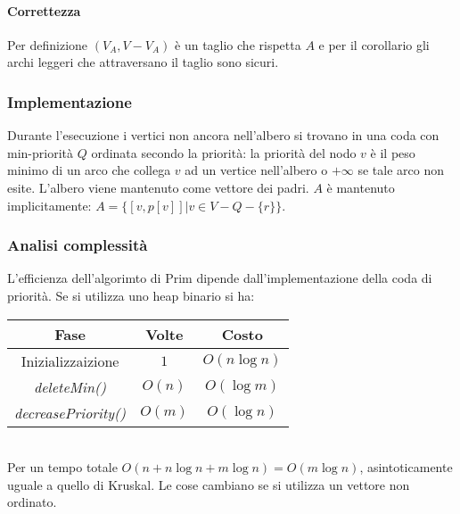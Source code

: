 \paragraph{Correttezza} Per definizione $(V_A, V - V_A)$ \`e un taglio che rispetta $A$ e per il corollario gli archi leggeri che attraversano il taglio sono sicuri. 
\subsubsection{Implementazione}
Durante l'esecuzione i vertici non ancora nell'albero si trovano in una coda con min-priorit\`a $Q$ ordinata secondo la priorit\`a: la priorit\`a del nodo $v$ \`e il peso minimo di un
arco che collega $v$ ad un vertice nell'albero o $+\infty$ se tale arco non esite. L'albero viene mantenuto come vettore dei padri. $A$ \`e mantenuto implicitamente: $A=\{[v, p[v]]|v\in
V-Q-\{r\}\}$. \\

\subsubsection{Analisi complessit\`a}
L'efficienza dell'algorimto di Prim dipende dall'implementazione della coda di priorit\`a. Se si utilizza uno heap binario si ha:\\
\begin{tabular}{|c|c|c|}
	\hline
	\textbf{Fase} & \textbf{Volte} & \textbf{Costo} \\
	\hline
	Inizializzaizione & $1$ & $O(n\log n)$ \\
	\hline
	\emph{deleteMin()} & $O(n)$ & $O(\log m)$ \\
	\hline
	\emph{decreasePriority()} & $O(m)$ & $O(\log n)$\\
	\hline
\end{tabular}\\
Per un tempo totale $O(n+n\log n+m\log n) = O(m\log n)$, asintoticamente uguale a quello di Kruskal. Le cose cambiano se si utilizza un vettore non ordinato.
